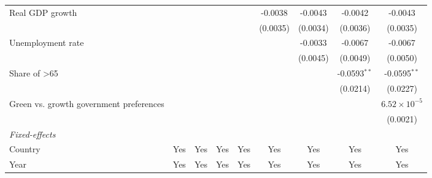 \begin{table}[htbp]
\begin{tabular}{lcccccccc}
      Real GDP growth                                                                 &          &          &                 &                 & -0.0038         & -0.0043         & -0.0042         & -0.0043\\   
                                                                                      &          &          &                 &                 & (0.0035)        & (0.0034)        & (0.0036)        & (0.0035)\\   
      Unemployment rate                                                               &          &          &                 &                 &                 & -0.0033         & -0.0067         & -0.0067\\   
                                                                                      &          &          &                 &                 &                 & (0.0045)        & (0.0049)        & (0.0050)\\   
      Share of >65                                                                    &          &          &                 &                 &                 &                 & -0.0593$^{**}$  & -0.0595$^{**}$\\   
                                                                                      &          &          &                 &                 &                 &                 & (0.0214)        & (0.0227)\\   
      Green vs. growth government preferences                                         &          &          &                 &                 &                 &                 &                 & $6.52\times 10^{-5}$\\    
                                                                                      &          &          &                 &                 &                 &                 &                 & (0.0021)\\   
      \midrule
      \emph{Fixed-effects}\\
      Country                                                                         & Yes      & Yes      & Yes             & Yes             & Yes             & Yes             & Yes             & Yes\\  
      Year                                                                            & Yes      & Yes      & Yes             & Yes             & Yes             & Yes             & Yes             & Yes\\  

\end{tabular}
\end{table}
